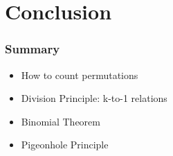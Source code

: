 \documentclass{beamer}
\begin{document}

\section{Conclusion}
\begin{frame}
  \frametitle{Summary}

  \begin{itemize}
  \item How to count permutations
  \item Division Principle: k-to-1 relations
  \item Binomial Theorem
  \item Pigeonhole Principle
  \end{itemize}
\end{frame}
\end{document}
